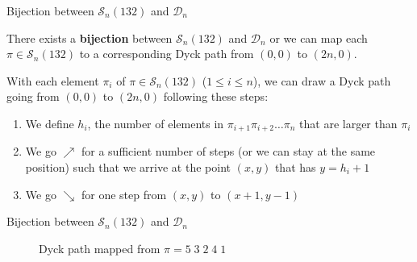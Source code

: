 \documentclass{beamer}  %
\begin{document}
\begin{frame}{Bijection between $\mathcal{S}_n(132)$ and $\mathcal{D}_n$}

    There exists a \textbf{bijection} between $\mathcal{S}_n(132)$ and $\mathcal{D}_n$ or we can map each $\pi \in \mathcal{S}_n(132)$ to a corresponding Dyck path from $(0,0)$ to $(2n,0)$.
    
    With each element $\pi_i$ of $\pi \in \mathcal{S}_n(132)$ ($1 \leq i \leq n$), we can draw a Dyck path going from $(0,0)$ to $(2n,0)$ following these steps:

\begin{enumerate}
    \item We define $h_i$, the number of elements in $\pi_{i+1}\pi_{i+2}\ldots \pi_{n}$ that are larger than $\pi_i$
    \item We go $\nearrow$ for a sufficient number of steps (or we can stay at the same position) such that we arrive at the point $(x,y)$ that has $y=h_i + 1$ 
    \item We go $\searrow$ for one step from $(x,y)$ to $(x + 1,y - 1)$
\end{enumerate}

\end{frame}

\begin{frame}{Bijection between $\mathcal{S}_n(132)$ and $\mathcal{D}_n$}

    \begin{figure}[htbp]
        \centering
    \caption{Dyck path mapped from $\pi=5\;3\;2\;4\;1$}
    \end{figure}
\end{frame}
\end{document}
